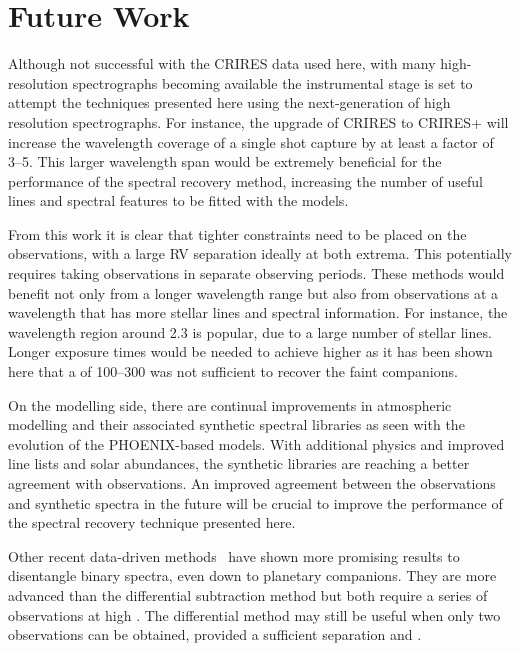 \section{Future Work}
\label{subsec:future}

Although not successful with the CRIRES data used here, with many high-resolution \nir{} spectrographs becoming available the instrumental stage is set to attempt the techniques presented here using the next-generation of high resolution spectrographs.
For instance, the upgrade of CRIRES to CRIRES+ will increase the wavelength coverage of a single shot capture by at least a factor of 3--5.
This larger wavelength span would be extremely beneficial for the \textchisquared{} performance of the spectral recovery method, increasing the number of useful lines and spectral features to be fitted with the models.

From this work it is clear that tighter constraints need to be placed on the observations, with a large {RV} separation ideally at both extrema. This potentially requires taking observations in separate observing periods.
These methods would benefit not only from a longer wavelength range but also from observations at a wavelength that has more stellar lines and spectral information.
For instance, the wavelength region around 2.3\um{} is popular, due to a large number of stellar  lines.
Longer exposure times would be needed to achieve higher \snr{} as it has been shown here that a \snr{} of 100--300 was not sufficient to recover the faint companions.

On the modelling side, there are continual improvements in atmospheric modelling and their associated synthetic spectral libraries as seen with the evolution of the PHOENIX-based models.
With additional physics and improved line lists and solar abundances, the synthetic libraries are reaching a better agreement with \nir{} observations.
An improved agreement between the \nir{} observations and synthetic spectra in the future will be crucial to improve the performance of the spectral recovery technique presented here.

Other recent data-driven methods~\citep[e.g.][]{piskorz_evidence_2016, czekala_disentangling_2017} have shown more promising results to disentangle binary spectra, even down to planetary companions.
They are more advanced than the differential subtraction method but both require a series of observations at high \snr{}.
The differential method may still be useful when only two observations can be obtained, provided a sufficient separation and \snr{}.

